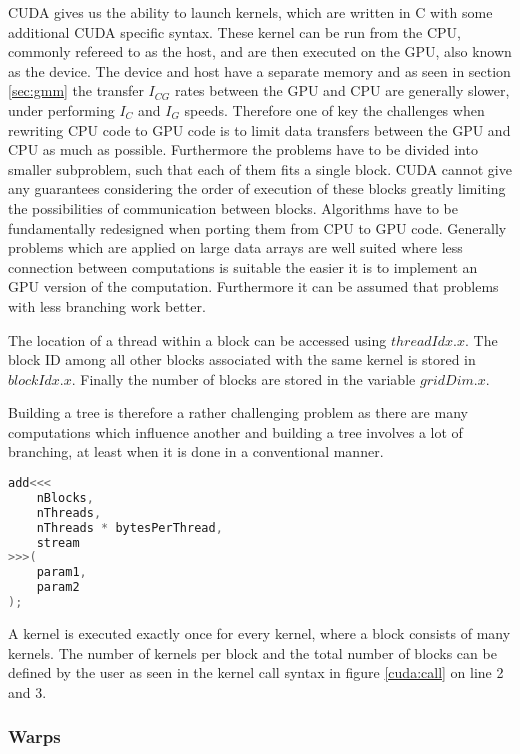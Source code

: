 \documentclass[]{article}
\begin{document}
CUDA gives us the ability to launch kernels, which are written in C with some additional CUDA specific syntax. These kernel can be run from the CPU, commonly refereed to as the host, and are then executed on the GPU, also known as the device. The device and host have a separate memory and as seen in section \ref{sec:gmm} the transfer $I_{CG}$ rates between the GPU and CPU are generally slower, under performing $I_{C}$ and $I_G$ speeds. Therefore one of key the challenges when rewriting CPU code to GPU code is to limit data transfers between the GPU and CPU as much as possible. Furthermore the problems have to be divided into smaller subproblem, such that each of them fits a single block. CUDA cannot give any guarantees considering the order of execution of these blocks greatly limiting the possibilities of communication between blocks. Algorithms have to be fundamentally redesigned when porting them from CPU to GPU code. Generally problems which are applied on large data arrays are well suited where less connection between computations is suitable  the easier it is to implement an GPU version of the computation. Furthermore it can be assumed that problems with less branching work better.

The location of a thread within a block can be accessed using $threadIdx.x$. The block ID among all other blocks associated with the same kernel is stored in $blockIdx.x$. Finally the number of blocks are stored in the variable $gridDim.x$. \cite{CUDAGuide}

Building a tree is therefore a rather challenging problem as there are many computations which influence another and building a tree involves a lot of branching, at least when it is done in a conventional manner.


\begin{lstlisting}[language=c++, caption=Calling a CUDA Kernel, label=cuda:call]
add<<<
	nBlocks,
	nThreads,
	nThreads * bytesPerThread,
	stream
>>>(
	param1,
	param2
);
\end{lstlisting}


A kernel is executed exactly once for every kernel, where a block consists of many kernels. The number of kernels per block and the total number of blocks can be defined by the user as seen in the kernel call syntax in figure \ref{cuda:call} on line 2 and 3. 


\subsubsection{Warps}
\end{document}
